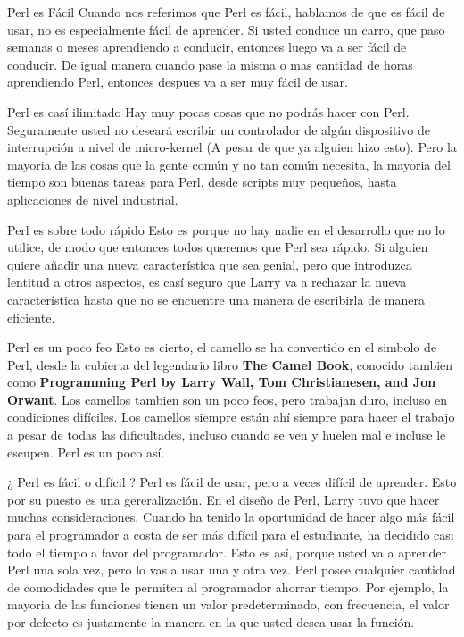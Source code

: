 \documentclass{beamer}
\begin{document}
\begin{frame}{Perl es Fácil} %
Cuando nos referimos que Perl es fácil, hablamos de que es fácil de usar, no es
especialmente fácil de aprender. Si usted conduce un carro, que paso semanas o
meses aprendiendo a conducir, entonces luego va a ser fácil de conducir. De
igual manera cuando pase la misma o mas cantidad de horas aprendiendo Perl,
entonces despues va a ser muy fácil de usar.  

\end{frame}

\begin{frame}{Perl es casí ilimitado} %
Hay muy pocas cosas que no podrás hacer con Perl. Seguramente usted no deseará
escribir un controlador de algún dispositivo de interrupción a nivel de
micro-kernel (A pesar de que ya alguien hizo esto). Pero la mayoria de las
cosas que la gente común y no tan común necesita,  la mayoria del tiempo son
buenas tareas para Perl, desde scripts muy pequeños, hasta aplicaciones de
nivel industrial. 
\end{frame}

\begin{frame}{Perl es sobre todo rápido} %
Esto es porque no hay nadie en el desarrollo que no lo utilice, de modo que
entonces todos queremos que Perl sea rápido. Si alguien quiere añadir una nueva
característica que sea genial, pero que introduzca lentitud a otros aspectos,
es casí seguro que Larry va a rechazar la nueva característica hasta que no se
encuentre una manera de escribirla de manera eficiente. 
\end{frame}

\begin{frame}{Perl es un poco feo} %
Esto es cierto, el camello se ha convertido en el simbolo de Perl, desde la
cubierta del legendario libro {\bf The Camel Book}, conocido tambien como
{\bf Programming Perl by Larry Wall, Tom Christianesen,  and Jon Orwant}. 
Los camellos tambien son un poco feos, pero trabajan duro, incluso en
condiciones difíciles. Los camellos siempre están ahí siempre para hacer el
trabajo a pesar de todas las dificultades, incluso cuando se ven y huelen mal e
incluse le escupen. Perl es un poco así.
\end{frame}

\begin{frame}{¿ Perl es fácil o difícil ?} %
Perl es fácil de usar, pero a veces difícil de aprender. Esto por su puesto es
una gereralización. En el diseño de Perl, Larry tuvo que hacer muchas
consideraciones. Cuando ha tenido la oportunidad de hacer algo más fácil para
el programador a costa de ser más difícil para el estudiante, ha decidido casi
todo el tiempo a favor del programador. Esto es así, porque usted va a aprender
Perl una sola vez, pero lo vas a usar una y otra vez. Perl posee cualquier
cantidad de comodidades que le permiten al programador ahorrar tiempo. Por
ejemplo,  la mayoria de las funciones tienen un valor predeterminado,  con
frecuencia,  el valor por defecto es justamente la manera en la que usted desea
usar la función. 
\end{frame}
\end{document}
